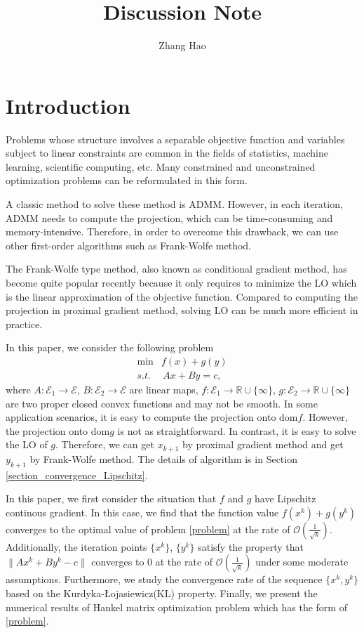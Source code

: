 \documentclass{article}
\title{Discussion Note}
\author{Zhang Hao}
\numberwithin{equation}{section}
\begin{document}
\maketitle


\section{Introduction }
Problems whose structure involves a separable objective function and variables subject to linear constraints are
common in the fields of statistics, machine learning, scientific computing, etc. Many constrained and unconstrained
optimization problems can be reformulated in this form. 

A classic method to solve these method is ADMM. However, in each iteration, ADMM needs to compute the projection, 
which can be time-consuming and memory-intensive. Therefore, in order to overcome this drawback, we can use other first-order
algorithms such as Frank-Wolfe method.

The Frank-Wolfe type method, also known as conditional gradient method, has become quite popular recently because it only requires to minimize the LO which is the linear approximation of the
objective function. Compared to computing the projection in proximal gradient method, solving LO can be much more
efficient in practice.

In this paper, we consider the following problem
\begin{align} \label{problem}
   \min & f(x)+g(y) \nonumber  \\
    s.t.&\hspace{2pt} Ax+By=c, 
\end{align}
where $A: \mathcal{E}_1 \rightarrow \mathcal{E}$, $B: \mathcal{E}_2 \rightarrow \mathcal{E}$ are linear maps, 
$f: \mathcal{E}_1 \rightarrow \mathbb{R}\cup\{\infty\}$, 
$g: \mathcal{E}_2 \rightarrow \mathbb{R}\cup\{\infty\}$ are two proper closed convex functions 
and may not be smooth. In some application scenarios, it is easy to compute the projection onto $\mathrm{dom} f$. However, the projection onto $\mathrm{dom} g$ is not as straightforward. In contrast, 
it is easy to solve the LO of $g$. Therefore, we can get $x_{k+1}$ by proximal gradient method and get $y_{k+1}$ by Frank-Wolfe
method.  The details of algorithm is in Section \ref{section_convergence_Lipschitz}.

In this paper, we first consider the situation that $f$ and $g$ have Lipschitz continous gradient. In this case, 
we find that the function value $f(x^k)+ g(y^k)$ converges to the optimal value of problem \eqref{problem}
at the rate of $\mathcal{O}\left( \frac{1}{\sqrt{k}} \right)$. Additionally, the iteration points $\{x^k\}$, $\{y^k\}$ 
satisfy the property that $\|Ax^k+By^k-c\rVert$  converges to 0 at the rate of $\mathcal{O}\left(\frac{1}{\sqrt{k}}\right)$ 
under some moderate assumptions. 
Furthermore, we study the convergence rate of the sequence $\{x^k,y^k\}$ based on the 
Kurdyka-\L{}ojasiewicz(KL) property. Finally, we present the numerical results of Hankel matrix optimization
problem which has the form of \eqref{problem}.  
\end{document}
